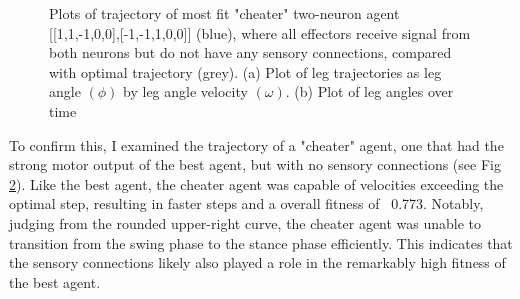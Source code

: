 \documentclass{article}
\begin{document}
\begin{figure}[htbp]
\begin{subfigure}[b]{0.5\textwidth}
    \caption{}
    \label{fig:AngleTimePlot2Cheat}
  \end{subfigure}
  \caption{Plots of trajectory of most fit "cheater" two-neuron agent [[1,1,-1,0,0],[-1,-1,1,0,0]] (blue), where all effectors receive signal from both neurons but do not have any sensory connections, compared with optimal trajectory (grey). (a) Plot of leg trajectories as leg angle \((\phi)\) by leg angle velocity \((\omega)\). (b) Plot of leg angles over time}
  \label{fig:plots2Cheat}
\end{figure} 

To confirm this, I examined the trajectory of a "cheater" agent, one that had the strong motor output of the best agent, but with no sensory connections (see Fig \ref{fig:plots2Cheat}). Like the best agent, the cheater agent was capable of velocities exceeding the optimal step, resulting in faster steps and a overall fitness of ~0.773. Notably, judging from the rounded upper-right curve, the cheater agent was unable to transition from the swing phase to the stance phase efficiently. This indicates that the sensory connections likely also played a role in the remarkably high fitness of the best agent.
\end{document}
